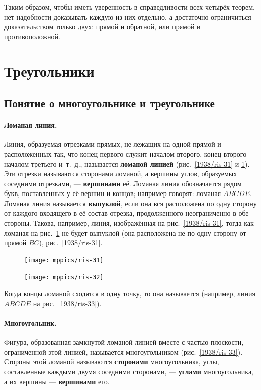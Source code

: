 \documentclass[oneside]{book}
\begin{document}
Таким образом, чтобы иметь уверенность в справедливости всех четырёх теорем, нет надобности доказывать каждую из них отдельно, а достаточно ограничиться доказательством только двух:
прямой и обратной, или прямой и противоположной.

\section{Треугольники}

\subsection*{Понятие о многоугольнике и треугольнике}

\paragraph{Ломаная линия.}\label{1938/33}
Линия, образуемая отрезками прямых, не лежащих на одной прямой и расположенных так, что конец первого служит началом второго, конец второго — началом третьего и~т.~д., называется \textbf{ломаной линией} (рис.~\ref{1938/ris-31} и \ref{1938/ris-32}).
Эти отрезки называются сторонами ломаной, а вершины углов, образуемых соседними отрезками, — \textbf{вершинами} её.
Ломаная линия обозначается рядом букв, поставленных у её вершин и концов;
например говорят:
ломаная $ABCDE$.
Ломаная линия называется \textbf{выпуклой}, если она вся расположена по одну сторону от каждого входящего в её состав отрезка, продолженного неограниченно в обе стороны.
Такова, например, линия, изображённая на рис.~\ref{1938/ris-31}, тогда как ломаная на рис.~\ref{1938/ris-32} не будет выпуклой (она расположена не по одну сторону от прямой $BC$), рис.~\ref{1938/ris-31}.

\begin{figure}
\begin{minipage}{.48\textwidth}
\centering
\texttt{[image: mppics/ris-31]}
\caption{}\label{1938/ris-31}
\end{minipage}\hfill
\begin{minipage}{.48\textwidth}
\centering
\texttt{[image: mppics/ris-32]}
\caption{}\label{1938/ris-32}
\end{minipage}
\end{figure}

Когда концы ломаной сходятся в одну точку, то она называется  (например, линия $ABCDE$ на рис.~\ref{1938/ris-33}).

\paragraph{Многоугольник.}\label{1938/34}
Фигура, образованная замкнутой ломаной линией вместе с частью плоскости, ограниченной этой линией, называется многоугольником (рис.~\ref{1938/ris-33}).
Стороны этой ломаной называются \textbf{сторонами} многоугольника, углы, составленные каждыми двумя соседними сторонами, — \textbf{углами} многоугольника, а их вершины — \textbf{вершинами} его.
\end{document}
